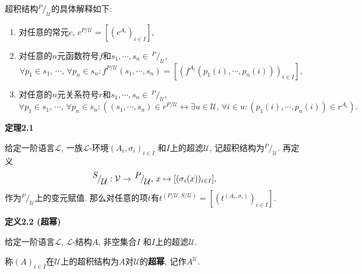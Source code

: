 \vspace{10pt}

超积结构$^{\displaystyle P}\!/_{\displaystyle\mathcal{U}}$的具体解释如下:
\vspace{3pt}
\begin{enumerate}
    \item 对任意的常元$c$, $c^{P/\mathcal{U}}=[(c^{A_i})_{i\in I}]$,
    \item 对任意的$n$元函数符号$f$和$s_1,\cdots,s_n\in\,\!
    ^{\displaystyle P}\!/_{\displaystyle\mathcal{U}}$,
    \[
        \forall p_1\in s_1,\,\cdots,\,\forall p_n\in s_n:
        f^{P/\mathcal{U}}(s_1,\cdots,s_n)=
        [(f^{A_i}(p_1(i),\cdots,p_n(i)))_{i\in I}],
    \]
    \item 对任意的$n$元关系符号$r$和$s_1,\cdots,s_n\in\,\!
    ^{\displaystyle P}\!/_{\displaystyle\mathcal{U}}$,
    \[
        \forall p_1\in s_1,\,\cdots,\,\forall p_n\in s_n:
        ((s_1,\cdots,s_n)\in r^{P/\mathcal{U}}\leftrightarrow\exists u\in\mathcal{U},\,
        \forall i\in u:(p_1(i),\cdots,p_n(i))\in r^{A_i}).
    \]
\end{enumerate}

\vspace{10pt}

\hypertarget{sec:定理2.1}{}
\noindent\textbf{定理2.1}

给定一阶语言$\mathcal{L}$, 一族$\mathcal{L}$-环境$(A_i,\sigma_i)_{i\in I}$
和$I$上的超滤$\mathcal{U}$,
记超积结构为$^{\displaystyle P}\!/_{\displaystyle\mathcal{U}}$. 再定义
\[
    ^{\displaystyle S}\!/_{\displaystyle\mathcal{U}}:
    \mathcal{V}\to\,^{\displaystyle P}\!/_{\displaystyle\mathcal{U}},\,
    x\mapsto[(\sigma_i(x))_{i\in I}],\\[3pt]
\]
作为$^{\displaystyle P}\!/_{\displaystyle\mathcal{U}}$上的变元赋值.
那么对任意的项$t$有$t^{(P/\mathcal{U},S/\mathcal{U})}
=[(t^{(A_i,\sigma_i)})_{i\in I}]$.

\vspace{10pt}

\hypertarget{sec:定义2.2}{}
\noindent\textbf{定义2.2 (超幂)}

给定一阶语言$\mathcal{L}$, $\mathcal{L}$-结构$A$, 非空集合$I$
和$I$上的超滤$\mathcal{U}$.

称$(A)_{i\in I}$在$\mathcal{U}$上的超积结构为$A$对$\mathcal{U}$的\textbf{超幂},
记作$A^\mathcal{U}$.

